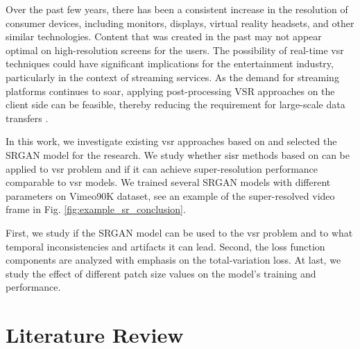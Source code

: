 \documentclass[conference]{IEEEtran}
\begin{document}
Over the past few years, there has been a consistent increase in the resolution of consumer devices, including monitors, displays, virtual reality headsets, and other similar technologies. Content that was created in the past may not appear optimal on high-resolution screens for the users. The possibility of real-time \acrshort{vsr} techniques could have significant implications for the entertainment industry, particularly in the context of streaming services. As the demand for streaming platforms continues to soar, applying post-processing VSR approaches on the client side can be feasible, thereby reducing the requirement for large-scale data transfers \cite{video_super_resolution_survey_2020}.

In this work, we investigate existing \acrshort{vsr} approaches based on  and selected the SRGAN \cite{srgan_2016} model for the research. We study whether \acrlong{sisr} methods based on  can be applied to \acrlong{vsr} problem and if it can achieve super-resolution performance comparable to \acrshort{vsr} models. We trained several SRGAN models with different parameters on Vimeo90K dataset, see an example of the super-resolved video frame in Fig. \ref{fig:example_sr_conclusion}.

First, we study if the SRGAN model can be used to the \acrshort{vsr} problem and to what temporal inconsistencies and artifacts it can lead. Second, the loss function components are analyzed with emphasis on the total-variation loss. At last, we study the effect of different patch size values on the model's training and performance.






\section{Literature Review}
\end{document}
